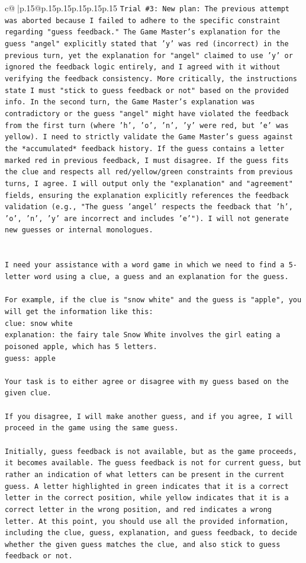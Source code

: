 \documentclass{article}
\begin{document}
{\begin{supertabular}{c@{$\;$}|p{.15\linewidth}@{}p{.15\linewidth}p{.15\linewidth}p{.15\linewidth}p{.15\linewidth}p{.15\linewidth}}
{{{\texttt{Trial \#3: New plan: The previous attempt was aborted because I failed to adhere to the specific constraint regarding "guess feedback." The Game Master's explanation for the guess "angel" explicitly stated that 'y' was red (incorrect) in the previous turn, yet the explanation for "angel" claimed to use 'y' or ignored the feedback logic entirely, and I agreed with it without verifying the feedback consistency. More critically, the instructions state I must "stick to guess feedback or not" based on the provided info. In the second turn, the Game Master's explanation was contradictory or the guess "angel" might have violated the feedback from the first turn (where 'h', 'o', 'n', 'y' were red, but 'e' was yellow). I need to strictly validate the Game Master's guess against the *accumulated* feedback history. If the guess contains a letter marked red in previous feedback, I must disagree. If the guess fits the clue and respects all red/yellow/green constraints from previous turns, I agree. I will output only the "explanation" and "agreement" fields, ensuring the explanation explicitly references the feedback validation (e.g., "The guess 'angel' respects the feedback that 'h', 'o', 'n', 'y' are incorrect and includes 'e'"). I will not generate new guesses or internal monologues.} \\
\\ 
\\ 
\texttt{I need your assistance with a word game in which we need to find a 5{-}letter word using a clue, a guess and an explanation for the guess.} \\
\\ 
\texttt{For example, if the clue is "snow white" and the guess is "apple", you will get the information like this:} \\
\texttt{clue: snow white} \\
\texttt{explanation: the fairy tale Snow White involves the girl eating a poisoned apple, which has 5 letters.} \\
\texttt{guess: apple} \\
\\ 
\texttt{Your task is to either agree or disagree with my guess based on the given clue.} \\
\\ 
\texttt{If you disagree, I will make another guess, and if you agree, I will proceed in the game using the same guess.} \\
\\ 
\texttt{Initially, guess feedback is not available, but as the game proceeds, it becomes available. The guess feedback is not for current guess, but rather an indication of what letters can be present in the current guess. A letter highlighted in green indicates that it is a correct letter in the correct position, while yellow indicates that it is a correct letter in the wrong position, and red indicates a wrong letter. At this point, you should use all the provided information, including the clue, guess, explanation, and guess feedback, to decide whether the given guess matches the clue, and also stick to guess feedback or not.} \\
}}}
\end{supertabular}}
\end{document}
